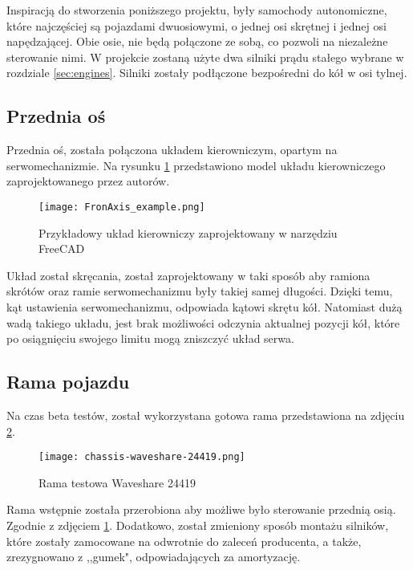     Inspiracją do stworzenia poniższego projektu, były samochody autonomiczne, które najczęściej są pojazdami dwuosiowymi, o jednej osi skrętnej i jednej osi napędzającej.
    Obie osie, nie będą połączone ze sobą, co pozwoli na niezależne sterowanie nimi.
    W projekcie zostaną użyte dwa silniki prądu stałego wybrane w rozdziale \ref{sec:engines}.
    Silniki zostały podłączone bezpośredni do kół w osi tylnej.
    \subsection{Przednia oś}
        Przednia oś, została połączona układem kierowniczym, opartym na serwomechanizmie.
        Na rysunku \ref{fig:frontAxis_model} przedstawiono model układu kierowniczego zaprojektowanego przez autorów.

        \begin{figure}[!ht]
            \centering
            \texttt{[image: FronAxis\_example.png]}
            \caption{Przykładowy układ kierowniczy zaprojektowany w narzędziu FreeCAD}
            \label{fig:frontAxis_model}
        \end{figure}
        Układ został skręcania, został zaprojektowany w taki sposób aby ramiona skrótów oraz ramie serwomechanizmu były takiej samej długości.
        Dzięki temu, kąt ustawienia serwomechanizmu, odpowiada kątowi skrętu kół.
        Natomiast dużą wadą takiego układu, jest brak możliwości odczynia aktualnej pozycji kół, które po osiągnięciu swojego limitu mogą zniszczyć układ serwa.

    \subsection{Rama pojazdu}
    Na czas beta testów, został wykorzystana gotowa rama przedstawiona na zdjęciu \ref{fig:test_chassis}.
    \begin{figure}[!ht]
        \centering
        \texttt{[image: chassis-waveshare-24419.png]}
        \caption{Rama testowa Waveshare 24419}
        \label{fig:test_chassis}
    \end{figure}

    Rama wstępnie została przerobiona aby możliwe było sterowanie przednią osią. Zgodnie z zdjęciem \ref{fig:frontAxis_model}.
    Dodatkowo, został zmieniony sposób montażu silników, które zostały zamocowane na odwrotnie do zaleceń producenta, a także, zrezygnowano z ,,gumek", odpowiadających za amortyzację.


